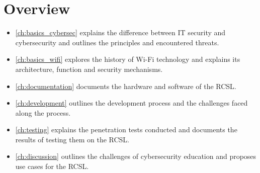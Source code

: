 \section{Overview}
\begin{itemize}
    \item \cref{ch:basics_cybersec} explains the difference between IT security and cybersecurity and outlines the principles and encountered threats.
    \item \cref{ch:basics_wifi} explores the history of Wi-Fi technology and explains its architecture, function and security mechanisms.
    \item \cref{ch:documentation} documents the hardware and software of the RCSL.
    \item \cref{ch:development} outlines the development process and the challenges faced along the process.
    \item \cref{ch:testing} explains the penetration tests conducted and documents the results of testing them on the RCSL.
    \item \cref{ch:discussion} outlines the challenges of cybersecurity education and proposes use cases for the RCSL.
\end{itemize}